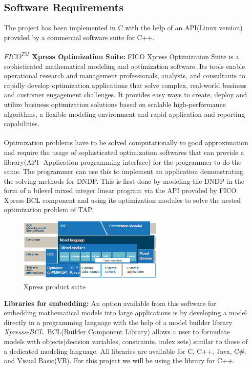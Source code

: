 \documentclass[a4paper, 12pt]{article}
\begin{document}
\subsection{Software Requirements}
The project has been implemented in C with the help of an API(Linux version) provided by a commercial software suite for C++.\\~\\
\textbf{\boldmath$FICO^{TM}$ Xpress Optimization Suite:}   FICO Xpress Optimization Suite is a sophisticated mathematical modeling and optimization software. Its tools enable operational research and management professionals, analysts, and consultants to rapidly develop optimization applications that solve complex, real-world business and customer engagement challenges. It provides easy ways to create, deploy and utilize business optimization solutions based on scalable high-performance algorithms, a flexible modeling environment and rapid application and reporting capabilities.\\~\\
Optimization problems have to be solved computationally to good approximation and require the usage of sophisticated optimization 
softwares that can provide a library(API- Application programming interface) for the programmer to do the same. The programmer can use this to
 implement an application demonstrating the solving methods for DNDP. This is first done by modeling the DNDP in the form of a bilevel mixed 
integer linear program via the API provided by FICO Xpress BCL component and using its optimization modules to solve the nested optimization 
problem of TAP.\par                   
\begin{figure}[h]
\centering
\includegraphics[width=0.65\textwidth, clip]{./Xpress.jpg}
\vspace{-0.15in}
\caption{Xpress product suite}
\label{fig:1}
\end{figure}
\noindent
\textbf{Libraries for embedding:}   An option available from this software for embedding mathematical models into large applications is by developing a model directly in a programming language with the help of a model builder library \textit{Xpresss-BCL}. BCL(Builder Component Library) allows a user to formulate models with objects(decision variables, constraints, index sets) similar to those of a dedicated modeling language. All libraries are available for C, C++, Java, C\#, and Visual Basic(VB). For this project we will be using the library for C++.\\ \par
\end{document}
